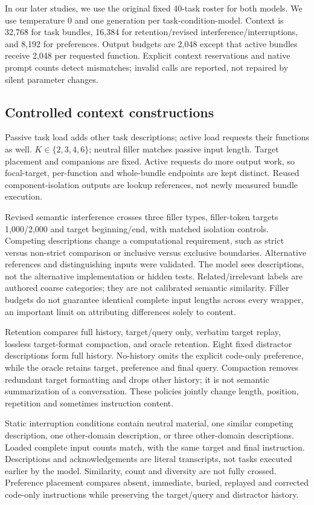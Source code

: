 \documentclass[10pt,a4paper,twocolumn]{article}
\begin{document}
In our later studies, we use the original fixed 40-task roster for both models. We
use temperature 0 and one generation per task-condition-model. Context is
32,768 for task bundles, 16,384 for retention/revised interference/interruptions,
and 8,192 for preferences. Output budgets are 2,048 except that active bundles
receive 2,048 per requested function. Explicit context reservations and native
prompt counts detect mismatches; invalid calls are reported, not repaired by
silent parameter changes.

\subsection{Controlled context constructions}
Passive task load adds other task descriptions; active load requests their
functions as well. $K\in\{2,3,4,6\}$; neutral filler matches passive input
length. Target placement and companions are fixed. Active requests do more
output work, so focal-target, per-function and whole-bundle endpoints are kept
distinct. Reused component-isolation outputs are lookup references, not newly
measured bundle execution.

Revised semantic interference crosses three filler types, filler-token targets
1,000/2,000 and target beginning/end, with matched isolation controls. Competing
descriptions change a computational requirement, such as strict versus
non-strict comparison or inclusive versus exclusive boundaries. Alternative
references and distinguishing inputs were validated. The model sees descriptions,
not the alternative implementation or hidden tests. Related/irrelevant labels
are authored coarse categories; they are not calibrated semantic similarity.
Filler budgets do not guarantee identical complete input lengths across every
wrapper, an important limit on attributing differences solely to content.

Retention compares full history, target/query only, verbatim target replay,
lossless target-format compaction, and oracle retention. Eight fixed distractor
descriptions form full history. No-history omits the explicit code-only
preference, while the oracle retains target, preference and final query.
Compaction removes redundant target formatting and drops other history; it is
not semantic summarization of a conversation. These policies jointly change
length, position, repetition and sometimes instruction content.

Static interruption conditions contain neutral material, one similar competing
description, one other-domain description, or three other-domain descriptions.
Loaded complete input counts match, with the same target and final instruction.
Descriptions and acknowledgements are literal transcripts, not tasks executed
earlier by the model. Similarity, count and diversity are not fully crossed.
Preference placement compares absent, immediate, buried, replayed and corrected
code-only instructions while preserving the target/query and distractor history.
\end{document}
